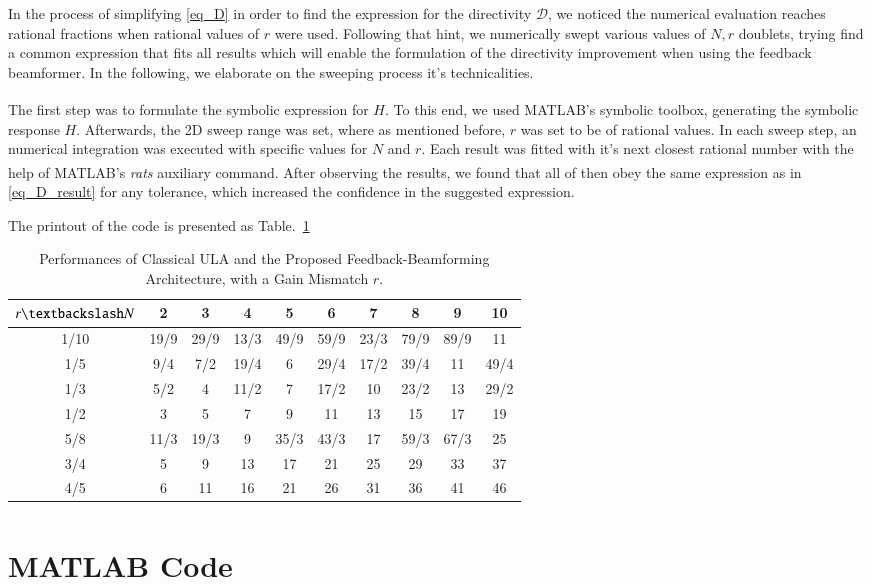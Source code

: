 In the process of simplifying \eqref{eq_D} in order to find the expression for the directivity $\mathcal{D}$, we noticed the numerical evaluation reaches rational fractions when rational values of $r$ were used.
Following that hint, we numerically swept various values of $N,r$ doublets, trying find a common expression that fits all results which will enable the formulation of the directivity improvement when using the feedback beamformer.
In the following, we elaborate on the sweeping process it's technicalities.
\par The first step was to formulate the symbolic expression for $H$.
To this end, we used MATLAB\textsuperscript{\textregistered}'s symbolic toolbox, generating the symbolic response $H$.
Afterwards, the 2D sweep range was set, where as mentioned before, $r$ was set to be of rational values.
In each sweep step, an numerical integration was executed with specific values for $N$ and $r$.
Each result was fitted with it's next closest rational number with the help of MATLAB\textsuperscript{\textregistered}'s \emph{rats} auxiliary command.
After observing the results, we found that all of then obey the same expression as in \eqref{eq_D_result} for any tolerance, which increased the confidence in the suggested expression.
\par The printout of the code is presented as Table.~\ref{table_D}
\begin{table}[h!]
    \caption{Performances of Classical ULA and the Proposed Feedback-Beamforming Architecture, with a Gain Mismatch $r$.}
    \centering
    {
        \begin{tabular}{||c c c c c c c c c c||}
            \hline
            $r \textbackslash N$ & 2 & 3 & 4 & 5 & 6 & 7 & 8 & 9 & 10 \\ [0.5ex] 
            \hline\hline
            1/10     & 19/9  & 29/9  & 13/3  & 49/9  & 59/9  & 23/3  & 79/9  & 89/9  & 11   \\ [1ex] 
            1/5      & 9/4   & 7/2   & 19/4  & 6     & 29/4  & 17/2  & 39/4  & 11    & 49/4 \\ [1ex] 
            1/3      & 5/2   & 4     & 11/2  & 7     & 17/2  & 10    & 23/2  & 13    & 29/2 \\ [1ex] 
            1/2      & 3     & 5     & 7     & 9     & 11    & 13    & 15    & 17    & 19   \\ [1ex] 
            5/8      & 11/3  & 19/3  & 9     & 35/3  & 43/3  & 17    & 59/3  & 67/3  & 25   \\ [1ex] 
            3/4      & 5     & 9     & 13    & 17    & 21    & 25    & 29    & 33    & 37   \\ [1ex] 
            4/5      & 6     & 11    & 16    & 21    & 26    & 31    & 36    & 41    & 46   \\ [1ex] 
            \hline
         \end{tabular}
     }
    \label{table_D}
\end{table}
\section*{MATLAB\textsuperscript{\textregistered} Code}

